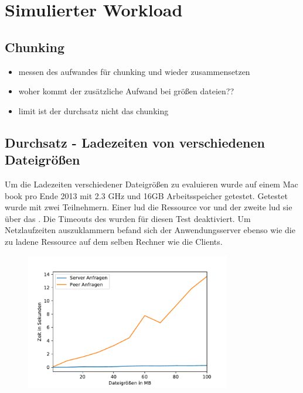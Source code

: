 \section{Simulierter Workload}
\subsection{Chunking}
\begin{itemize}
	\item messen des aufwandes für chunking und wieder zusammensetzen
	\item woher kommt der zusätzliche Aufwand bei größen dateien??
	\item limit ist der durchsatz nicht das chunking
\end{itemize}

\subsection{Durchsatz - Ladezeiten von verschiedenen Dateigrößen}
Um die Ladezeiten verschiedener Dateigrößen zu evaluieren wurde auf einem Mac book pro Ende 2013 mit 2.3 GHz und 16GB Arbeitsspeicher getestet. 
Getestet wurde mit zwei Teilnehmern. Einer lud die Ressource vor und der zweite lud sie über das \pTp \cdn. Die Timeouts des \pTp \cdns wurden für diesen Test deaktiviert. Um Netzlaufzeiten auszuklammern befand sich der Anwendungsserver ebenso wie die zu ladene Ressource auf dem selben Rechner wie die Clients. 

\begin{figure}[!h]
	\centering
	\includegraphics[width=0.8\textwidth]{figures/Timing_file_size}
	\caption[A Figure Short-Title]{}
	\label{fig:timing_file_size}
\end{figure}

